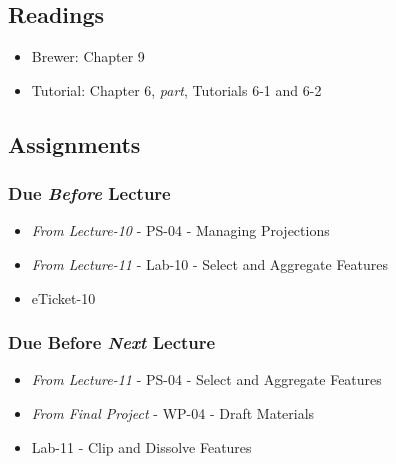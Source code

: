 \documentclass[
]{book}
\providecommand{\tightlist}{%
  \setlength{\itemsep}{0pt}\setlength{\parskip}{0pt}}
\begin{document}
\hypertarget{readings-12}{%
\subsection*{Readings}\label{readings-12}}

\begin{itemize}
\tightlist
\item
  Brewer: Chapter 9
\item
  Tutorial: Chapter 6, \emph{part}, Tutorials 6-1 and 6-2
\end{itemize}

\hypertarget{assignments-13}{%
\subsection*{Assignments}\label{assignments-13}}

\hypertarget{due-before-lecture-11}{%
\subsubsection*{\texorpdfstring{Due \emph{Before} Lecture}{Due Before Lecture}}\label{due-before-lecture-11}}

\begin{itemize}
\tightlist
\item
  \emph{From Lecture-10} - PS-04 - Managing Projections
\item
  \emph{From Lecture-11} - Lab-10 - Select and Aggregate Features
\item
  eTicket-10
\end{itemize}

\hypertarget{due-before-next-lecture-10}{%
\subsubsection*{\texorpdfstring{Due Before \emph{Next} Lecture}{Due Before Next Lecture}}\label{due-before-next-lecture-10}}

\begin{itemize}
\tightlist
\item
  \emph{From Lecture-11} - PS-04 - Select and Aggregate Features
\item
  \emph{From Final Project} - WP-04 - Draft Materials
\item
  Lab-11 - Clip and Dissolve Features
\end{itemize}
\end{document}
